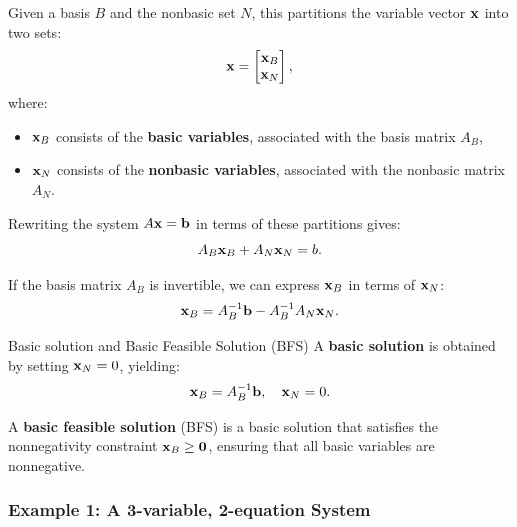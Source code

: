  Given a basis $B$ and the nonbasic set $N$, this partitions the variable vector \( \mathbf{x} \) into two sets:
\[
\mathbf{x} =
\begin{bmatrix}
    \mathbf{x}_B \\ \mathbf{x}_N
\end{bmatrix},
\]
where:
\begin{itemize}
\item  \( \mathbf{x}_B \) consists of the \textbf{basic variables}, associated with the basis matrix \( A_B \),
\item\( \mathbf{x}_N \) consists of the \textbf{nonbasic variables}, associated with the nonbasic matrix \( A_N \).
\end{itemize}

Rewriting the system \( A\mathbf{x} =\mathbf{b}\) in terms of these partitions gives:
\begin{equation}
A_B \mathbf{x}_B + A_N \mathbf{x}_N = b.
\end{equation}

If the basis matrix \( A_B \) is invertible, we can express \( \mathbf{x}_B \) in terms of \( \mathbf{x}_N \):
\begin{equation}
\mathbf{x}_B = A_B^{-1}\mathbf{b}- A_B^{-1} A_N \mathbf{x}_N.
\end{equation}

\begin{definition}{Basic solution and Basic Feasible Solution (BFS)}{}
A \textbf{basic solution} is obtained by setting \( \mathbf{x}_N = 0 \), yielding:
\begin{equation}
\mathbf{x}_B = A_B^{-1} \mathbf{b}, \quad \mathbf{x}_N = 0.
\end{equation}

A \textbf{basic feasible solution} (BFS) is a basic solution that satisfies the nonnegativity constraint \( \mathbf{x}_B \geq \mathbf{0} \), ensuring that all basic variables are nonnegative.
\end{definition}
\subsubsection*{Example 1: A 3-variable, 2-equation System}

